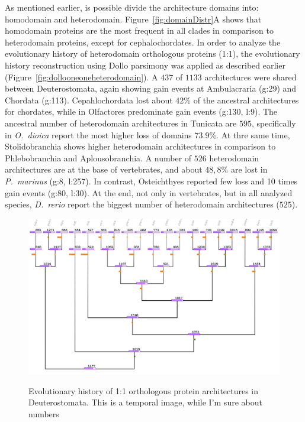 \documentclass[11pt]{article}
\newcommand{\TODO}[1]{\begingroup\color{red}#1\endgroup}
\begin{document}
As mentioned earlier, is possible divide the architecture domains into: homodomain 
and heterodomain. Figure~\ref{fig:domainDistr}A shows that homodomain proteins 
are the most frequent in all clades in comparison to heterodomain proteins, 
except for cephalochordates. In order to analyze the evolutionary history of 
heterodomain orthologous proteins (1:1), the evolutionary history reconstruction 
using Dollo parsimony was applied as described earlier (Figure~\ref{fig:dollooneoneheterodomain}). A $437$ of $1133$ architectures were shared 
between Deuterostomata, again showing gain events at Ambulacraria (g:29) and 
Chordata (g:113). Cepahlochordata lost about $42$\% of the ancestral architectures 
for chordates, while in Olfactores predominate gain events (g:130, l:9). The 
ancestral number of heterodomain architectures in Tunicata are $595$, specifically 
in \textit{O.\ dioica} report the most higher loss of domains $73.9$\%. 
At thre same time, Stolidobranchia shows higher heterodomain architectures in 
comparison to Phlebobranchia and Aplousobranchia. A number of $526$ heterodomain
 architectures are at the base of vertebrates, and about $48,8$\% are lost in 
 \textsl{P.\ marinus} (g:8, l:257). In contrast, Osteichthyes reported few loss and 
 10 times gain events (g:80, l:30). At the end, not only in vertebrates, but in all 
analyzed species, \textit{D.\ rerio} report the biggest number of heterodomain 
architectures ($525$).

\begin{figure}[ht!]
\centering
\includegraphics[scale=0.53]{figures/provisionalDollo} \\
\caption{Evolutionary history of 1:1 orthologous protein architectures in 
Deuterostomata. \TODO{This is a temporal image, while I'm sure about numbers}}\label{fig:dollooneone}
\end{figure}
\end{document}
